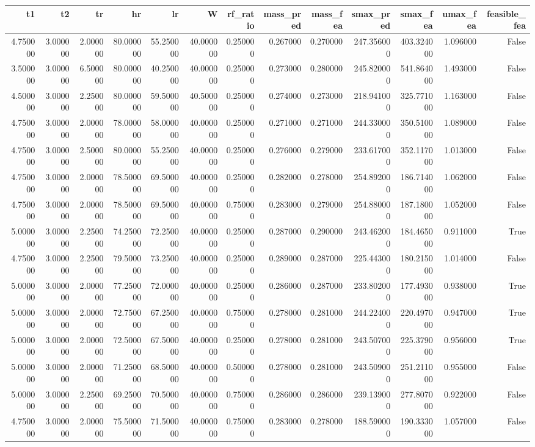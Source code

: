 \begin{tabular}{rrrrrrrrrrrrr}
\toprule
t1 & t2 & tr & hr & lr & W & rf_ratio & mass_pred & mass_fea & smax_pred & smax_fea & umax_fea & feasible_fea \\
\midrule
4.750000 & 3.000000 & 2.000000 & 80.000000 & 55.250000 & 40.000000 & 0.250000 & 0.267000 & 0.270000 & 247.356000 & 403.324000 & 1.096000 & False \\
3.500000 & 3.000000 & 6.500000 & 80.000000 & 40.250000 & 40.000000 & 0.250000 & 0.273000 & 0.280000 & 245.820000 & 541.864000 & 1.493000 & False \\
4.500000 & 3.000000 & 2.250000 & 80.000000 & 59.500000 & 40.500000 & 0.250000 & 0.274000 & 0.273000 & 218.941000 & 325.771000 & 1.163000 & False \\
4.750000 & 3.000000 & 2.000000 & 78.000000 & 58.000000 & 40.000000 & 0.250000 & 0.271000 & 0.271000 & 244.330000 & 350.510000 & 1.089000 & False \\
4.750000 & 3.000000 & 2.500000 & 80.000000 & 55.250000 & 40.000000 & 0.250000 & 0.276000 & 0.279000 & 233.617000 & 352.117000 & 1.013000 & False \\
4.750000 & 3.000000 & 2.000000 & 78.500000 & 69.500000 & 40.000000 & 0.250000 & 0.282000 & 0.278000 & 254.892000 & 186.714000 & 1.062000 & False \\
4.750000 & 3.000000 & 2.000000 & 78.500000 & 69.500000 & 40.000000 & 0.750000 & 0.283000 & 0.279000 & 254.880000 & 187.180000 & 1.052000 & False \\
5.000000 & 3.000000 & 2.250000 & 74.250000 & 72.250000 & 40.000000 & 0.250000 & 0.287000 & 0.290000 & 243.462000 & 184.465000 & 0.911000 & True \\
4.750000 & 3.000000 & 2.250000 & 79.500000 & 73.250000 & 40.000000 & 0.250000 & 0.289000 & 0.287000 & 225.443000 & 180.215000 & 1.014000 & False \\
5.000000 & 3.000000 & 2.000000 & 77.250000 & 72.000000 & 40.000000 & 0.250000 & 0.286000 & 0.287000 & 233.802000 & 177.493000 & 0.938000 & True \\
5.000000 & 3.000000 & 2.000000 & 72.750000 & 67.250000 & 40.000000 & 0.750000 & 0.278000 & 0.281000 & 244.224000 & 220.497000 & 0.947000 & True \\
5.000000 & 3.000000 & 2.000000 & 72.500000 & 67.500000 & 40.000000 & 0.250000 & 0.278000 & 0.281000 & 243.507000 & 225.379000 & 0.956000 & True \\
5.000000 & 3.000000 & 2.000000 & 71.250000 & 68.500000 & 40.000000 & 0.500000 & 0.278000 & 0.281000 & 243.509000 & 251.211000 & 0.955000 & False \\
5.000000 & 3.000000 & 2.250000 & 69.250000 & 70.500000 & 40.000000 & 0.750000 & 0.286000 & 0.286000 & 239.139000 & 277.807000 & 0.922000 & False \\
4.750000 & 3.000000 & 2.000000 & 75.500000 & 71.500000 & 40.000000 & 0.750000 & 0.283000 & 0.278000 & 188.590000 & 190.333000 & 1.057000 & False \\
\bottomrule
\end{tabular}
